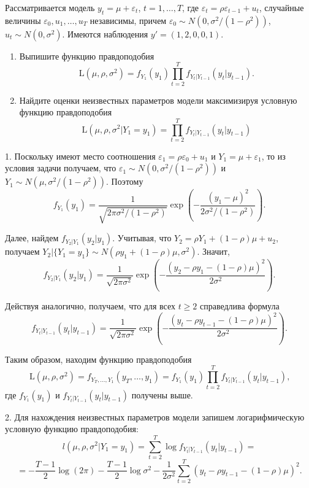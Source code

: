 \begin{problem}
Рассматривается модель $y_t = \mu + \varepsilon_t$, $t = 1,\ldots,T$, где $\varepsilon_t = \rho \varepsilon_{t-1} + u_t$, случайные величины $\varepsilon_0, u_1,\dots,u_T$ независимы, причем $\varepsilon_0 \sim N(0,\sigma^2/(1 - \rho^2))$, $u_t \sim N(0,\sigma^2)$. Имеются наблюдения $y' = (1, 2, 0, 0, 1)$.
\begin{enumerate}
  \item Выпишите функцию правдоподобия
  \[
  \mathrm{L}(\mu, \rho, \sigma^2) = f_{Y_1}(y_1)\prod_{t=2}^{T}f_{Y_t|Y_{t-1}}(y_t|y_{t-1}).
  \]
  \item Найдите оценки неизвестных параметров модели максимизируя условную функцию правдоподобия
  \[
  \mathrm{L}(\mu, \rho, \sigma^2|Y_1 = y_1) = \prod_{t=2}^{T}f_{Y_t|Y_{t-1}}(y_t|y_{t-1})
  \]
\end{enumerate}


\begin{sol}
1. Поскольку имеют место соотношения $\varepsilon_1 = \rho \varepsilon_0 + u_1$ и $Y_1 =\mu + \varepsilon_1$, то из условия задачи получаем, что $\varepsilon_1 \sim N(0,\sigma^2 / (1 - \rho^2))$
и $Y_1 \sim N(\mu,\sigma^2 / (1 - \rho^2))$. Поэтому
\[
f_{Y_1}(y_1) = \frac{1}{\sqrt{2\pi\sigma^2/(1-\rho^2)}}\exp{\left(-\frac{(y_1 - \mu)^2}{2\sigma^2/(1 - \rho^2)}\right)}.
\]

Далее, найдем $f_{Y_2|Y_1}(y_2|y_1)$. Учитывая, что $Y_2 = \rho Y_1 + (1- \rho) \mu + u_2$, получаем $Y_2|\{Y_1 = y_1\} \sim N(\rho y_1 + (1- \rho) \mu, \sigma^2)$. Значит,
\[
f_{Y_2|Y_1}(y_2|y_1) = \frac{1}{\sqrt{2\pi\sigma^2}}\exp{\left(-\frac{(y_2 - \rho y_1 - (1- \rho) \mu)^2}{2\sigma^2}\right)}.
\]

Действуя аналогично, получаем, что для всех $t \geq 2$ справедлива формула
\[
f_{Y_{t}|Y_{t-1}}(y_{t}|y_{t-1}) = \frac{1}{\sqrt{2\pi\sigma^2}}\exp{\left(-\frac{(y_{t} - \rho y_{t-1} - (1- \rho) \mu)^2}{2\sigma^2}\right)}.
\]

Таким образом, находим функцию правдоподобия
\[
\mathrm{L}(\mu, \rho, \sigma^2) = f_{Y_T,\ldots,Y_1}(y_T,\dots,y_1) = f_{Y_1}(y_1)\prod_{t=2}^{T}f_{Y_t|Y_{t-1}}(y_t|y_{t-1}) \text{,}
\]
где $f_{Y_1}(y_1)$ и $f_{Y_t|Y_{t-1}}(y_t|y_{t-1})$ получены выше.

2. Для нахождения неизвестных параметров модели запишем логарифмическую условную функцию правдоподобия:
\[
l(\mu, \rho, \sigma^2|Y_1 = y_1) = \sum_{t=2}^{T}\log{f_{Y_t|Y_{t-1}}(y_t|y_{t-1})} =
\]
\[
=-\frac{T-1}{2} \log(2 \pi) - \frac{T-1}{2} \log{\sigma^2} - \frac{1}{2\sigma^2} \sum_{t=2}^{T}(y_t - \rho y_{t-1} - (1 - \rho) \mu)^2 \text{.}
\]


\end{sol}
\end{problem}
